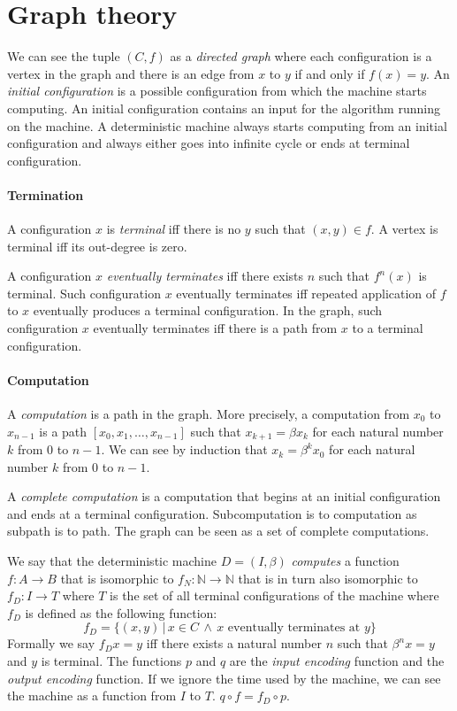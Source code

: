 \section{Graph theory}

We can see the tuple $(C,f)$ as a \emph{directed graph}
where each configuration is a vertex in the graph
and there is an edge from $x$ to $y$ if and only if $f(x) = y$.
An \emph{initial configuration} is a possible configuration from which the machine starts computing.
An initial configuration contains an input for the algorithm running on the machine.
A deterministic machine always starts computing from an initial configuration
and always either goes into infinite cycle or ends at terminal configuration.

\paragraph{Termination}
A configuration $x$ is \emph{terminal} iff
there is no $y$ such that $(x,y) \in f$.
A vertex is terminal iff its out-degree is zero.

A configuration $x$ \emph{eventually terminates}
iff there exists $n$ such that $f^n(x)$ is terminal.
Such configuration $x$ eventually terminates iff repeated application of $f$ to $x$
eventually produces a terminal configuration.
In the graph, such configuration $x$ eventually terminates iff
there is a path from $x$ to a terminal configuration.

\paragraph{Computation}
A \emph{computation} is a path in the graph.
More precisely, a computation from $x_0$ to $x_{n-1}$
is a path $[x_0, x_1, \ldots, x_{n-1}]$
such that $x_{k+1} = \beta x_k$ for each natural number $k$ from $0$ to $n-1$.
We can see by induction that $x_k = \beta^k x_0$ for each natural number $k$ from $0$ to $n-1$.

A \emph{complete computation} is a computation that begins at an initial configuration
and ends at a terminal configuration.
Subcomputation is to computation as subpath is to path.
The graph can be seen as a set of complete computations.

We say that the deterministic machine $D = (I,\beta)$ \emph{computes} a function
$f : A \to B$
that is isomorphic to
$f_N : \mathbb{N} \to \mathbb{N}$
that is in turn also isomorphic to
$f_D : I \to T$
where $T$ is the set of all terminal configurations of the machine
where $f_D$ is defined as the following function:
\begin{equation}
    f_D = \{ (x,y) \,|\, x \in C \,\wedge\, x \text{ eventually terminates at } y \}
\end{equation}
Formally we say $f_D x = y$ iff there exists
a natural number $n$ such that $\beta^n x = y$ and $y$ is terminal.
The functions $p$ and $q$ are the \emph{input encoding} function
and the \emph{output encoding} function.
If we ignore the time used by the machine,
we can see the machine as a function from $I$ to $T$.
$q \circ f = f_D \circ p$.

